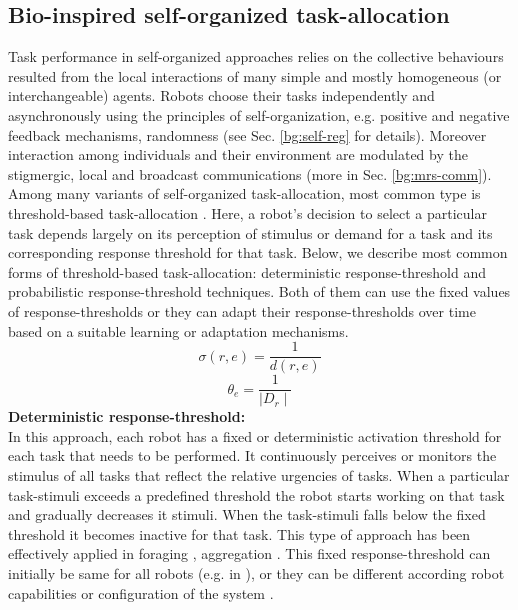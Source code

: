 \subsection{Bio-inspired self-organized task-allocation}
\label{bg:mrta:self-organized}
Task performance in self-organized approaches relies on the collective behaviours resulted from the local interactions of many simple and mostly homogeneous (or interchangeable) agents. Robots choose their tasks independently and asynchronously using the principles of self-organization, e.g. positive and negative feedback mechanisms, randomness (see Sec. \ref{bg:self-reg} for details). Moreover interaction among individuals and their environment are modulated by the stigmergic, local and broadcast communications (more in Sec. \ref{bg:mrs-comm}).  Among many variants of self-organized task-allocation, most common type is threshold-based task-allocation \cite{Bonabeau+1999}. Here, a robot's decision to select a particular task depends largely on its perception of stimulus or demand for a task and its corresponding response threshold for that task. Below, we describe most common forms of threshold-based task-allocation:  deterministic response-threshold and probabilistic response-threshold techniques. Both of them can use the fixed values of response-thresholds or they can adapt their response-thresholds over time based on a suitable learning or adaptation mechanisms.\\ 
\begin{equation}
\label{eqn:fixed-response-th1}
\sigma (r,e) = \frac{1}{d(r,e)}
\end{equation}
\begin{equation}
\label{eqn:fixed-response-th2}
\theta_{e} = \frac{1}{\mid D_{r} \mid}
\end{equation}
\textbf{Deterministic response-threshold:}\\
In this approach, each robot has a fixed or deterministic activation threshold for each task that needs to be performed. It continuously perceives or monitors the stimulus of all tasks that reflect the relative urgencies of tasks. When a particular task-stimuli exceeds a predefined  threshold the robot starts working on that task and gradually decreases it stimuli. When the task-stimuli falls below the fixed threshold it becomes inactive for that task. This type of approach has been effectively applied in foraging , aggregation . This fixed response-threshold can initially be same for all robots (e.g. in \cite{Jones+200}), or they can be different according robot capabilities or configuration of the system .\\ 
